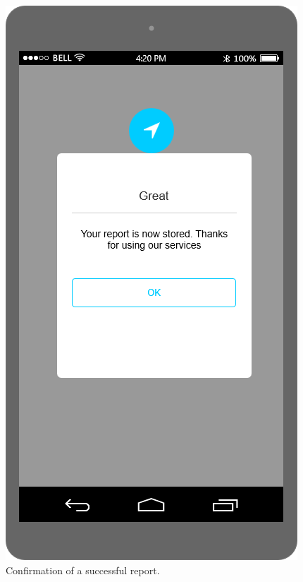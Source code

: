 \documentclass[./main.tex]{subfiles}
\begin{document}
\begin{figure}
\begin{minipage}[t]{\mockupdimension}
    \end{minipage}
    \hfill
    \begin{minipage}[t]{\mockupdimension}
        \includegraphics[width=\textwidth]{resources/Mockups/reports_stored}
        \caption{Confirmation of a successful report.}
        \label{fig:reports_stored}
    \end{minipage}
\end{figure}
\end{document}
